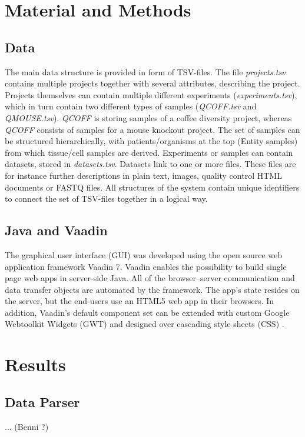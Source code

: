 \documentclass[a4paper, 11pt]{article}
\begin{document}
\section{Material and Methods}
\subsection{Data}
The main data structure is provided in form of TSV-files. The file \emph{projects.tsv} contains multiple projects together with several attributes, describing the project. Projects themselves can contain multiple different experiments (\emph{experiments.tsv}), which in turn contain two different types of samples (\emph{QCOFF.tsv} and \emph{QMOUSE.tsv}). \emph{QCOFF} is storing samples of a coffee diversity project, whereas \emph{QCOFF} consists of samples for a mouse knockout project. The set of samples can be structured hierarchically, with patients/organisms at the top (Entity samples) from which tissue/cell samples are derived. Experiments or samples can contain datasets, stored in \emph{datasets.tsv}. Datasets link to one or more files. These files are for instance further descriptions in plain text, images, quality control HTML documents or FASTQ files. All structures of the system contain unique identifiers to connect the set of TSV-files together in a logical way.
\subsection{Java and Vaadin}
The graphical user interface (GUI) was developed using the open source web application framework Vaadin 7. Vaadin enables the possibility to build single page web apps in server-side Java. All of the browser–server communication and data transfer objects are automated by the framework. The app's state resides on the server, but the end-users use an HTML5 web app in their browsers. In addition, Vaadin's default component set can be extended with custom Google Webtoolkit Widgets (GWT) and designed over cascading style sheets (CSS) \cite{Vaadin}. 
\section{Results}
\subsection{Data Parser}
... (Benni ?)
\end{document}
